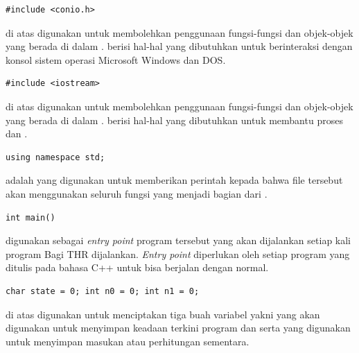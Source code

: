 \documentclass[../main.tex]{subfiles}
\begin{document}
\begin{code}
\begin{verbatim}
#include <conio.h> 
\end{verbatim}
\end{code}

{\Script} di atas digunakan untuk membolehkan penggunaan fungsi-fungsi dan objek-objek yang berada di dalam {\header} {\file} . {\Header} {\file}  berisi hal-hal yang dibutuhkan untuk berinteraksi dengan konsol sistem operasi Microsoft Windows dan DOS.

\begin{code}
\begin{verbatim}
#include <iostream>
\end{verbatim}
\end{code}

{\Script} di atas digunakan untuk membolehkan penggunaan fungsi-fungsi dan objek-objek yang berada di dalam {\header} {\file} . {\Header} {\file}  berisi hal-hal yang dibutuhkan untuk membantu proses {\ioi} dan {\ioo}.

\begin{code}
\begin{verbatim}
using namespace std;
\end{verbatim}
\end{code}

{\Script}  adalah {\statement} yang digunakan untuk memberikan perintah kepada {\compiler} bahwa file tersebut akan menggunakan seluruh fungsi yang menjadi bagian dari .

\begin{code}
\begin{verbatim}
int main() 
\end{verbatim}
\end{code}

{\Script} digunakan sebagai \textit{entry point} program tersebut yang akan dijalankan setiap kali program Bagi THR dijalankan. \textit{Entry point} diperlukan oleh setiap program yang ditulis pada bahasa C++ untuk bisa berjalan dengan normal.

\begin{code}
\begin{verbatim}
char state = 0; int n0 = 0; int n1 = 0;
\end{verbatim}
\end{code}

{\Script} di atas digunakan untuk menciptakan tiga buah variabel yakni  yang akan digunakan untuk menyimpan keadaan terkini program dan  serta  yang digunakan untuk menyimpan masukan atau perhitungan sementara.
\end{document}
